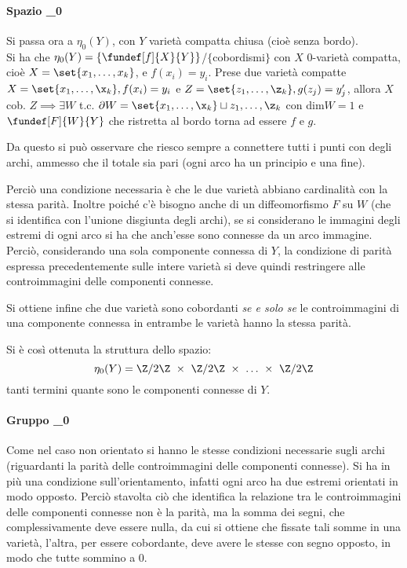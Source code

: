 \paragraph{Spazio \eta_0}
Si passa ora a $\eta_0(Y)$, con $Y$ varietà compatta chiusa (cioè senza bordo). \\
Si ha che $\eta_0(Y) = \{\fundef[f]{X}{Y}\}$/$\{$cobordismi$\}$ con $X$ 0-varietà compatta, cioè $X = \set{x_1, \dots, x_k}$, e $f(x_i) = y_i$.
Prese due varietà compatte $X = \set{x_1, \dots, \x_k}, f(x_i) = y_i$ e $Z = \set{z_1, \dots, \z_k}, g(z_j) = y'_j$, allora $X$ cob. $Z \implies \exists W$ t.c. $\partial W = \set{x_1, \dots, \x_k}\sqcup{z_1, \dots, \z_k}$ con dim$W = 1$ e $\fundef[F]{W}{Y}$ che ristretta al bordo torna ad essere $f$ e $g$.
\begin{es}
Da questo si può osservare che riesco sempre a connettere tutti i punti con degli archi, ammesso che il totale sia pari (ogni arco ha un principio e una fine).
\end{es}
Perciò una condizione necessaria è che le due varietà abbiano cardinalità con la stessa parità. Inoltre poiché c'è bisogno anche di un diffeomorfismo $F$ su $W$ (che si identifica con l'unione disgiunta degli archi), se si considerano le immagini degli estremi di ogni arco si ha che anch'esse sono connesse da un arco immagine. Perciò, considerando una sola componente connessa di $Y$, la condizione di parità espressa precedentemente sulle intere varietà si deve quindi restringere alle controimmagini delle componenti connesse.

Si ottiene infine che due varietà sono cobordanti \emph{se e solo se} le controimmagini di una componente connessa in entrambe le varietà hanno la stessa parità.

Si è così ottenuta la struttura dello spazio: 
\begin{equation*}
\eta_0(Y) = \Z/2\Z~\times~\Z/2\Z~\times~\dots~\times~\Z/2\Z
\end{equation*}
tanti termini quante sono le componenti connesse di $Y$.


\paragraph{Gruppo \Omega_0}
Come nel caso non orientato si hanno le stesse condizioni necessarie sugli archi (riguardanti la parità delle controimmagini delle componenti connesse). Si ha in più una condizione sull'orientamento, infatti ogni arco ha due estremi orientati in modo opposto.
Perciò stavolta ciò che identifica la relazione tra le controimmagini delle componenti connesse non è la parità, ma la somma dei segni, che complessivamente deve essere nulla, da cui si ottiene che fissate tali somme in una varietà, l'altra, per essere cobordante, deve avere le stesse con segno opposto, in modo che tutte sommino a 0.

